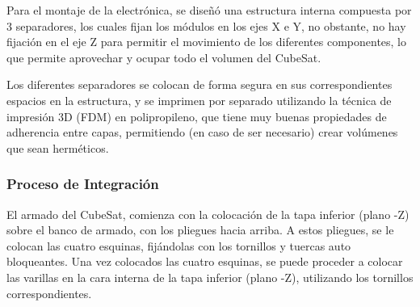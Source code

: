       Para el montaje de la electrónica, se diseñó una estructura interna compuesta por 3 separadores,
      los cuales fijan los módulos en los ejes X e Y, no obstante, no hay fijación en el eje Z para
      permitir el movimiento de los diferentes componentes, lo que permite aprovechar y ocupar todo el
      volumen del CubeSat.

      Los diferentes separadores se colocan de forma segura en sus correspondientes espacios en la
      estructura, y se imprimen por separado utilizando la técnica de impresión 3D (FDM) en polipropileno,
      que tiene muy buenas propiedades de adherencia entre capas, permitiendo (en caso de ser necesario)
      crear volúmenes que sean herméticos.
    \subsubsection{Proceso de Integración}

      El armado del CubeSat, comienza con la colocación de la tapa inferior (plano -Z) sobre
      el banco de armado, con los pliegues hacia arriba. A estos pliegues, se le colocan las cuatro
      esquinas, fijándolas con los tornillos y tuercas auto bloqueantes. Una vez colocados las cuatro
      esquinas, se puede proceder a colocar las varillas en la cara interna de la tapa inferior (plano
      -Z), utilizando los tornillos correspondientes.

